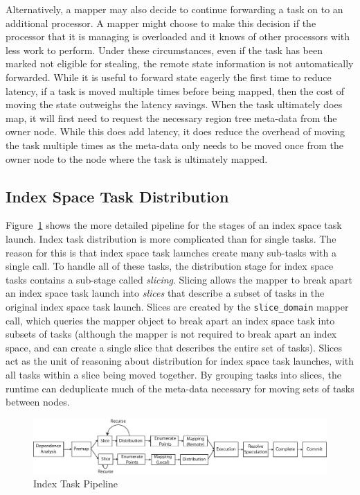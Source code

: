 Alternatively, a mapper may also decide to continue
forwarding a task on to an additional processor.
A mapper might choose to make this decision if the
processor that it is managing is overloaded and it
knows of other processors with less work to perform.
Under these circumstances, even if the task has
been marked not eligible for stealing, the remote
state information is not automatically forwarded.
While it is useful to forward state eagerly the 
first time to reduce latency, if a task is moved
multiple times before being mapped, then the 
cost of moving the state outweighs the latency
savings. When the task ultimately does map, it
will first need to request the necessary region
tree meta-data from the owner node. While this
does add latency, it does reduce the overhead
of moving the task multiple times as the meta-data
only needs to be moved once from the owner node
to the node where the task is ultimately mapped.

\subsection{Index Space Task Distribution}
\label{subsec:indexdist}
Figure~\ref{fig:indextaskdist} shows the more detailed
pipeline for the stages of an index space task launch.
Index task distribution is more complicated than
for single tasks.  The reason for this is that
index space task launches create many sub-tasks
with a single call. To handle all of these tasks,
the distribution stage for index space tasks 
contains a sub-stage called {\em slicing}. Slicing
allows the mapper to break apart an index space
task launch into {\em slices} that describe a
subset of tasks in the original index space task
launch. Slices are created by the {\tt slice\_domain}
mapper call, which queries the mapper object 
to break apart an index space task into subsets of
tasks (although the mapper is not required to break 
apart an index space, and can create a single slice
that describes the entire set of tasks). Slices
act as the unit of reasoning about distribution 
for index space task launches, with all tasks
within a slice being moved together. By grouping
tasks into slices, the runtime can deduplicate
much of the meta-data necessary for moving sets
of tasks between nodes. 

\begin{figure}
\centering
\includegraphics[scale=0.57]{figs/IndexTaskPipeline.pdf}
\caption{Index Task Pipeline\label{fig:indextaskdist}}
\end{figure}

